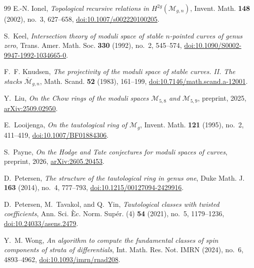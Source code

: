 \documentclass[12pt,reqno]{amsart}
\theoremstyle{definition}
\theoremstyle{remark}
\begin{document}
\begin{thebibliography}{99}
E.-N. Ionel,
\emph{Topological recursive relations in $H^{2g}(\mathcal M_{g,n})$},
Invent. Math. \textbf{148} (2002), no.~3, 627--658,
\href{https://doi.org/10.1007/s002220100205}
{doi:10.1007/s002220100205}.

S.~Keel,
\emph{Intersection theory of moduli space of stable $n$-pointed curves of
genus zero},
Trans. Amer. Math. Soc. \textbf{330} (1992), no.~2, 545--574,
\href{https://doi.org/10.1090/S0002-9947-1992-1034665-0}
{doi:10.1090/S0002-9947-1992-1034665-0}.

F.~F. Knudsen,
\emph{The projectivity of the moduli space of stable curves. II. The stacks
$\overline{\mathcal M}_{g,n}$},
Math. Scand. \textbf{52} (1983), 161--199,
\href{https://doi.org/10.7146/math.scand.a-12001}
{doi:10.7146/math.scand.a-12001}.

Y.~Liu,
\emph{On the Chow rings of the moduli spaces $\mathcal M_{5,8}$ and
$\mathcal M_{5,9}$},
preprint, 2025,
\href{https://arxiv.org/abs/2509.02950}{arXiv:2509.02950}.

E.~Looijenga,
\emph{On the tautological ring of $\mathcal M_g$},
Invent. Math. \textbf{121} (1995), no.~2, 411--419,
\href{https://doi.org/10.1007/BF01884306}
{doi:10.1007/BF01884306}.

S.~Payne,
\emph{On the Hodge and Tate conjectures for moduli spaces of curves},
preprint, 2026,
\href{https://arxiv.org/abs/2605.20453}{arXiv:2605.20453}.

D.~Petersen,
\emph{The structure of the tautological ring in genus one},
Duke Math. J. \textbf{163} (2014), no.~4, 777--793,
\href{https://doi.org/10.1215/00127094-2429916}
{doi:10.1215/00127094-2429916}.

D.~Petersen, M.~Tavakol, and Q.~Yin,
\emph{Tautological classes with twisted coefficients},
Ann. Sci. \`Ec. Norm. Sup\'er. (4) \textbf{54} (2021), no.~5, 1179--1236,
\href{https://doi.org/10.24033/asens.2479}{doi:10.24033/asens.2479}.

Y.~M. Wong,
\emph{An algorithm to compute the fundamental classes of spin components
of strata of differentials},
Int. Math. Res. Not. IMRN (2024), no.~6, 4893--4962,
\href{https://doi.org/10.1093/imrn/rnad208}
{doi:10.1093/imrn/rnad208}.

\end{thebibliography}
\end{document}
